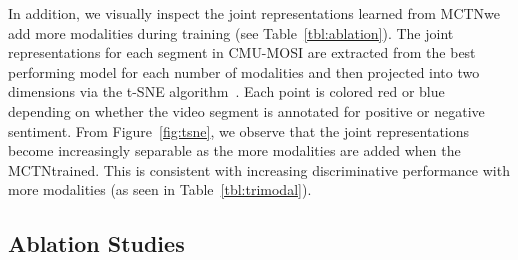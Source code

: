 \documentclass[letterpaper]{article} %
\newcommand{\citep}{\cite}
\newcommand{\ours}{MCTN}
\begin{document}
In addition, we visually inspect the joint representations learned from \ours \as we add more modalities during training
(see Table~\ref{tbl:ablation}). 
The joint representations for each segment in CMU-MOSI are extracted from the best performing model for each number of modalities and then projected into two dimensions via the t-SNE algorithm~\citep{vanDerMaaten2008}. Each point is colored red or blue depending on whether the video segment is annotated for positive or negative sentiment. From Figure~\ref{fig:tsne}, we observe that the joint representations become increasingly separable as the more modalities are added when the \ours \is trained. This is consistent with increasing discriminative performance with more modalities (as seen in Table~\ref{tbl:trimodal}).




\subsection{Ablation Studies}
\end{document}
